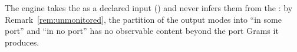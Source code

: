 
\begin{requirement}\label{req:declared-port-map}
The engine takes the  as a declared input
() and never infers them from the :
by Remark~\ref{rem:unmonitored}, the partition of the output modes into
``in some port'' and ``in no port'' has no observable content beyond the port
Grams it produces.
\end{requirement}
